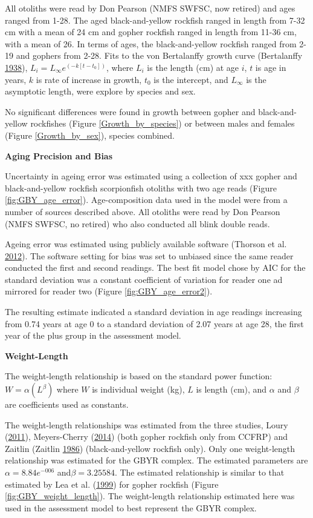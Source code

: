 \documentclass[12pt,]{article}
\begin{document}
All otoliths were read by Don Pearson (NMFS SWFSC, now retired) and ages
ranged from 1-28. The aged black-and-yellow rockfish ranged in length
from 7-32 cm with a mean of 24 cm and gopher rockfish ranged in length
from 11-36 cm, with a mean of 26. In terms of ages, the black-and-yellow
rockfish ranged from 2-19 and gophers from 2-28. Fits to the von
Bertalanffy growth curve (Bertalanffy
\protect\hyperlink{ref-vonB1938}{1938}),
\(L_i = L_{\infty}e^{(-k[t-t_0])}\), where \(L_i\) is the length (cm) at
age \(i\), \(t\) is age in years, \(k\) is rate of increase in growth,
\(t_0\) is the intercept, and \(L_{\infty}\) is the asymptotic length,
were explore by species and sex.

No significant differences were found in growth between gopher and
black-and-yellow rockfishes (Figure \ref{Growth_by_species}) or between
males and females (Figure \ref{Growth_by_sex}), species combined.

\vspace{.5cm} \textbf{Aging Precision and Bias}

Uncertainty in ageing error was estimated using a collection of xxx
gopher and black-and-yellow rockfish scorpionfish otoliths with two age
reads (Figure \ref{fig:GBY_age_error}). Age-composition data used in the
model were from a number of sources described above. All otoliths were
read by Don Pearson (NMFS SWFSC, no retired) who also conducted all
blink double reads.

Ageing error was estimated using publicly available software (Thorson et
al. \protect\hyperlink{ref-Thorson2012}{2012}). The software setting for
bias was set to unbiased since the same reader conducted the first and
second readings. The best fit model chose by AIC for the standard
deviation was a constant coefficient of variation for reader one ad
mirrored for reader two (Figure \ref{fig:GBY_age_error2}).

The resulting estimate indicated a standard deviation in age readings
increasing from 0.74 years at age 0 to a standard deviation of 2.07
years at age 28, the first year of the plus group in the assessment
model.

\vspace{.5cm} \textbf{Weight-Length}

The weight-length relationship is based on the standard power function:
\(W = \alpha(L^\beta)\) where \(W\) is individual weight (kg), \(L\) is
length (cm), and \(\alpha\) and \(\beta\) are coefficients used as
constants.

The weight-length relationships was estimated from the three studies,
Loury (\protect\hyperlink{ref-Loury2011}{2011}), Meyers-Cherry
(\protect\hyperlink{ref-MeyersCherry2014}{2014}) (both gopher rockfish
only from CCFRP) and Zaitlin (Zaitlin
\protect\hyperlink{ref-Zaitlin1986}{1986}) (black-and-yellow rockfish
only). Only one weight-length relationship was estimated for the GBYR
complex. The estimated parameters are \(\alpha = 8.84e^{-006}\)
and\(\beta = 3.25584\). The estimated relationship is similar to that
estimated by Lea et al. (\protect\hyperlink{ref-Lea1999}{1999}) for
gopher rockfish (Figure \ref{fig:GBY_weight_length}). The weight-length
relationship estimated here was used in the assessment model to best
represent the GBYR complex.
\end{document}
